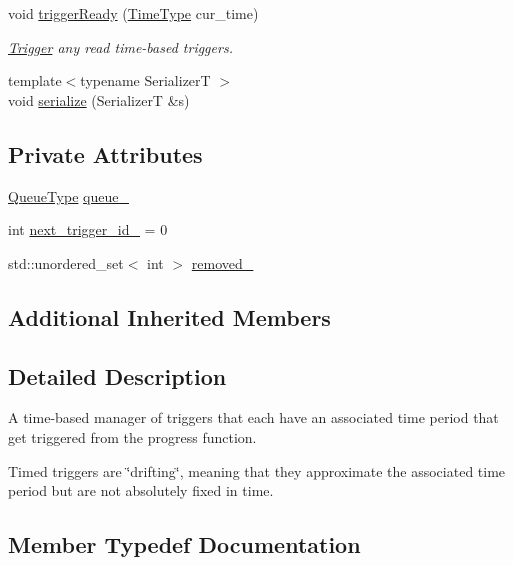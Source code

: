 \begin{DoxyCompactItemize}
void \hyperlink{structvt_1_1timetrigger_1_1_time_trigger_manager_a57c2be01d872ed68e2261786468e3979}{trigger\+Ready} (\hyperlink{namespacevt_a2b9f28078dc309ad0706b69ded743e69}{Time\+Type} cur\+\_\+time)
\begin{DoxyCompactList}\small\item\em \hyperlink{structvt_1_1timetrigger_1_1_trigger}{Trigger} any read time-\/based triggers. \end{DoxyCompactList}\item 
{\footnotesize template$<$typename SerializerT $>$ }\\void \hyperlink{structvt_1_1timetrigger_1_1_time_trigger_manager_a2ae1e322a7f8ad4799060158c43acf27}{serialize} (SerializerT \&s)
\end{DoxyCompactItemize}
\subsection*{Private Attributes}
\begin{DoxyCompactItemize}
\item 
\hyperlink{structvt_1_1timetrigger_1_1_time_trigger_manager_ad5dc7eeeb4b0d12a5582544d8f0a08c8}{Queue\+Type} \hyperlink{structvt_1_1timetrigger_1_1_time_trigger_manager_aa7a4a5f115644540035596b1057e2ac2}{queue\+\_\+}
\item 
int \hyperlink{structvt_1_1timetrigger_1_1_time_trigger_manager_a97d23d2d8ae1bafe79456c68db0d5b26}{next\+\_\+trigger\+\_\+id\+\_\+} = 0
\item 
std\+::unordered\+\_\+set$<$ int $>$ \hyperlink{structvt_1_1timetrigger_1_1_time_trigger_manager_aac6dda4fd78e5338f6bec56b75e038cd}{removed\+\_\+}
\end{DoxyCompactItemize}
\subsection*{Additional Inherited Members}


\subsection{Detailed Description}
A time-\/based manager of triggers that each have an associated time period that get triggered from the progress function. 

Timed triggers are \char`\"{}drifting\char`\"{}, meaning that they approximate the associated time period but are not absolutely fixed in time. 

\subsection{Member Typedef Documentation}
\mbox{\label{structvt_1_1timetrigger_1_1_time_trigger_manager_ad5dc7eeeb4b0d12a5582544d8f0a08c8}} 
